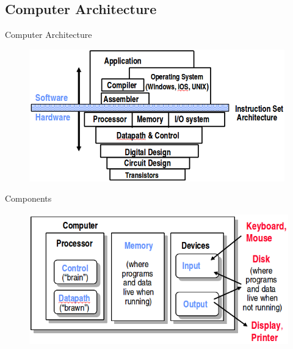 \documentclass[xcolor=x11names,compress]{beamer}
\renewcommand{\(}{\begin{columns}}
\renewcommand{\)}{\end{columns}}
\newcommand{\<}[1]{\begin{column}{#1}}
\renewcommand{\>}{\end{column}}
\begin{document}
\subsection{Computer Architecture}
\begin{frame}{Computer Architecture}
 \begin{figure}
   \begin{center}
     \includegraphics[height=2.25in,clip]{../figs/ComputerArchitecture}
   \end{center}
 \end{figure}
\end{frame}

\begin{frame}{Components}
 \begin{figure}
   \begin{center}
     \includegraphics[height=2.25in,clip]{../figs/Components}
   \end{center}
 \end{figure}
\end{frame}

\end{document}
